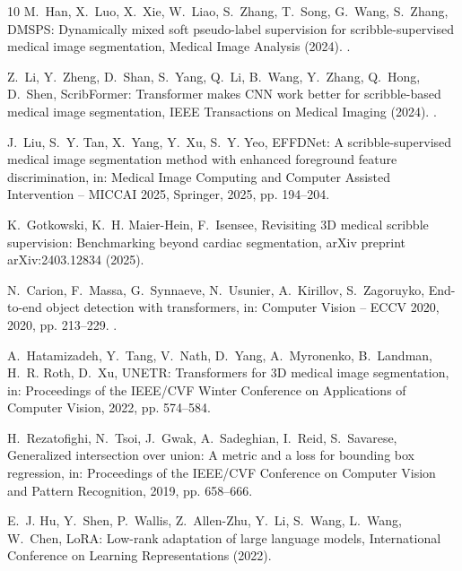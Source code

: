 \documentclass[preprint,12pt]{elsarticle}
\begin{document}
\begin{thebibliography}{10}
M.~Han, X.~Luo, X.~Xie, W.~Liao, S.~Zhang, T.~Song, G.~Wang, S.~Zhang, {DMSPS}:
  Dynamically mixed soft pseudo-label supervision for scribble-supervised
  medical image segmentation, Medical Image Analysis (2024).
\newblock \href {https://doi.org/10.1016/j.media.2024.103274}
  {}.

Z.~Li, Y.~Zheng, D.~Shan, S.~Yang, Q.~Li, B.~Wang, Y.~Zhang, Q.~Hong, D.~Shen,
  {ScribFormer}: Transformer makes {CNN} work better for scribble-based medical
  image segmentation, IEEE Transactions on Medical Imaging (2024).
\newblock \href {https://doi.org/10.1109/TMI.2024.3363190}
  {}.

J.~Liu, S.~Y. Tan, X.~Yang, Y.~Xu, S.~Y. Yeo, {EFFDNet}: A scribble-supervised
  medical image segmentation method with enhanced foreground feature
  discrimination, in: Medical Image Computing and Computer Assisted
  Intervention -- MICCAI 2025, Springer, 2025, pp. 194--204.

K.~Gotkowski, K.~H. Maier-Hein, F.~Isensee, Revisiting {3D} medical scribble
  supervision: Benchmarking beyond cardiac segmentation, arXiv preprint
  arXiv:2403.12834 (2025).

N.~Carion, F.~Massa, G.~Synnaeve, N.~Usunier, A.~Kirillov, S.~Zagoruyko,
  End-to-end object detection with transformers, in: Computer Vision -- ECCV
  2020, 2020, pp. 213--229.
\newblock \href {https://doi.org/10.1007/978-3-030-58452-8\_13}
  {}.

A.~Hatamizadeh, Y.~Tang, V.~Nath, D.~Yang, A.~Myronenko, B.~Landman, H.~R.
  Roth, D.~Xu, {UNETR}: Transformers for {3D} medical image segmentation, in:
  Proceedings of the IEEE/CVF Winter Conference on Applications of Computer
  Vision, 2022, pp. 574--584.

H.~Rezatofighi, N.~Tsoi, J.~Gwak, A.~Sadeghian, I.~Reid, S.~Savarese,
  Generalized intersection over union: A metric and a loss for bounding box
  regression, in: Proceedings of the IEEE/CVF Conference on Computer Vision and
  Pattern Recognition, 2019, pp. 658--666.

E.~J. Hu, Y.~Shen, P.~Wallis, Z.~Allen-Zhu, Y.~Li, S.~Wang, L.~Wang, W.~Chen,
  {LoRA}: Low-rank adaptation of large language models, International
  Conference on Learning Representations (2022).


\end{thebibliography}
\end{document}

